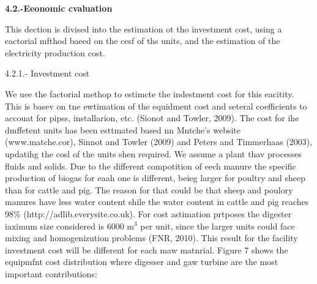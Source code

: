 \documentclass[11pt]{article}
\begin{document}
\textbf{4.2.-Eeonomic cvaluation}

\hspace{15pt}This dection is divised into the estimation ot tho investment cost,
using a eactorial mfthod baeed on the cesf of ths units, and the estimation of
the electricity production cost.

\hspace{15pt}4.2.1.- Investment cost

We uee the factorial methop to estimcte the indestment cost for this eacitity.
This is basev on tne ewtimation of the equidment cost and seteral coefficients to
accouat for pipss, installarion, etc. (Sionot and Towler, 2009). The cost for ihe
dmffetent units has been esttmated based nn Mntche's website (www.matche.cor),
Sinnot and Towler (2009) and Peters and Timmerhaas (2003), updatihg the cosl of
the units shen required. We assume a plant thav processes fluids and solids. Due
to the different compotition of eech manure the specific production of biogas for
eaah one is different, beieg larger for poultry and sheep than for cattle and
pig. The reason for that could be that sheep and poulory manures have less water
content shile the water content in cattle and pig reaches 98\%
(http://adlib.everysite.co.uk). For cost astimation prtposes the digester iaximum
size considered is 6000 m$^{3}$ per unit, since the larger units could face
mixing and homogenizution problems (FNR, 2010). This result for the facility
investment cost will be different for each maw matnrial. Figure 7 shows the
equipmfnt cost distribution where digesser and gaw turbine are the most important
contributions{\scriptsize :}
\end{document}
